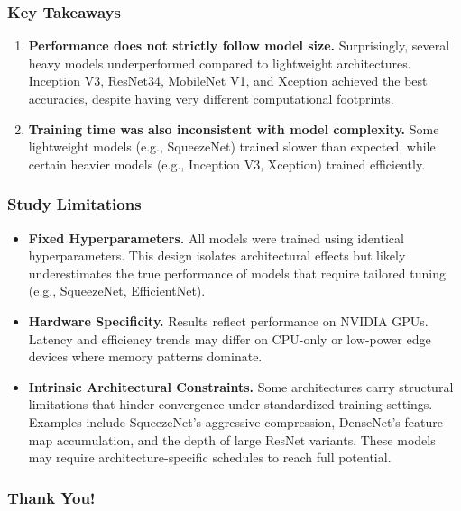 \documentclass{beamer}
\begin{document}
\begin{frame}
    \frametitle{Key Takeaways}
    \begin{enumerate}
        \item \textbf{Performance does not strictly follow model size.}  
              Surprisingly, several heavy models underperformed compared to lightweight architectures.  
              Inception V3, ResNet34, MobileNet V1, and Xception achieved the best accuracies, despite having very different computational footprints.

        \item \textbf{Training time was also inconsistent with model complexity.}  
              Some lightweight models (e.g., SqueezeNet) trained slower than expected,  
              while certain heavier models (e.g., Inception V3, Xception) trained efficiently.
    \end{enumerate}
\end{frame}


\begin{frame}
    \frametitle{Study Limitations}
    \begin{itemize}
        \item \textbf{Fixed Hyperparameters.}  
              All models were trained using identical hyperparameters.  
              This design isolates architectural effects but likely  
              underestimates the true performance of models that  
              require tailored tuning (e.g., SqueezeNet, EfficientNet).

        \item \textbf{Hardware Specificity.}  
              Results reflect performance on NVIDIA GPUs.  
              Latency and efficiency trends may differ on CPU-only or  
              low-power edge devices where memory patterns dominate.

        \item \textbf{Intrinsic Architectural Constraints.}  
              Some architectures carry structural limitations that  
              hinder convergence under standardized training settings.  
              Examples include SqueezeNet's aggressive compression,  
              DenseNet's feature-map accumulation, and the depth of  
              large ResNet variants. These models may require  
              architecture-specific schedules to reach full potential.
    \end{itemize}
\end{frame}

\begin{frame}
  \frametitle{Thank You!}
  \InfContacts
\end{frame}
\end{document}
